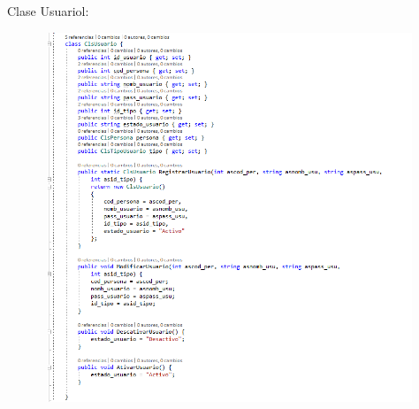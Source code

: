 \documentclass[12pt]{article}
\begin{document}
\begin{enumerate}[label*=\arabic*.]
\begin{enumerate}[label*=\arabic*.]
\newpage
Clase Usuariol:
\begin{figure}[H]
	\begin{Center}
		\includegraphics[width=4.91in,height=4.35in]{./media/14.png}
	\end{Center}
\end{figure}


\end{enumerate}
\end{enumerate}\par


\vspace{\baselineskip}

\vspace{\baselineskip}

\vspace{\baselineskip}

\vspace{\baselineskip}

\printbibliography
\end{document}
